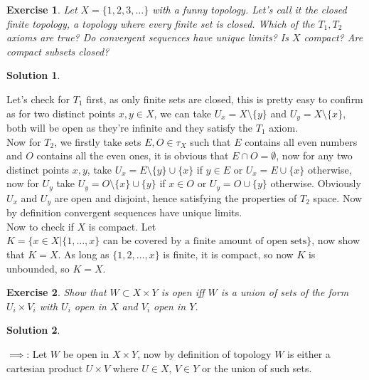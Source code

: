 \documentclass[11pt,a4paper]{article}
\newtheorem{Ex}{Exercise}
\newtheorem{Sol}{Solution}
\begin{document}
\begin{Ex}
	Let $X = \{1,2,3, \dots\}$ with a funny topology. Let's call it the closed finite topology, a topology where every finite set is closed. Which of the $T_1, T_2$ axioms are true? Do convergent sequences have unique limits? Is $X$ compact? Are compact subsets closed? 
\end{Ex}
\begin{Sol}\end{Sol}
\noindent Let's check for $T_1$ first, as only finite sets are closed, this is pretty easy to confirm as for two distinct points $x,y \in X$, we can take $U_x = X \setminus \{y\}$ and $U_y = X \setminus \{x\}$, both will be open as they're infinite and they satisfy the $T_1$ axiom. \\
 Now for $T_2$, we firstly take sets $E,O \in \tau_X$ such that $E$ contains all even numbers and $O$ contains all the even ones, it is obvious that $E \cap O = \emptyset$, now for any two distinct points $x, y$, take $U_x = E \setminus \{y\} \cup \{x\}$ if $y \in E$ or $U_x = E \cup \{x\}$ otherwise, now for $U_y$ take $U_y = O \setminus \{x\} \cup \{y\}$ if $x \in O$ or $U_y = O \cup \{y\}$ otherwise. Obviously $U_x$ and $U_y$ are open and disjoint, hence satisfying the properties of $T_2$ space. Now by definition convergent sequences have unique limits. \\
  Now to check if $X$ is compact. Let $K = \{x \in X| \{1, \dots, x \} \text{ can be covered by a finite amount of open sets}\}$, now show that $K = X$. As long as $\{1,2, \dots, x\}$ is finite, it is compact, so now $K$ is unbounded, so $K = X$.
  
\begin{Ex}
	Show that $W \subset X \times Y$ is open iff $W$ is a union of sets of the form $U_i \times V_i$ with $U_i$ open in $X$ and $V_i$ open in $Y$.
\end{Ex}

\begin{Sol} \end{Sol}
\noindent $\implies$: Let $W$ be open in $X \times Y$, now by definition of topology $W$ is either a cartesian product $U \times V$ where $U \in X$, $V \in Y$ or the union of such sets.
\end{document}

